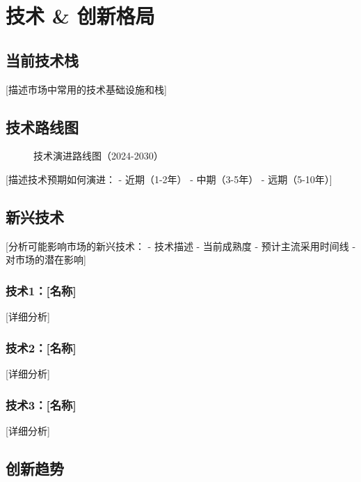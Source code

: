 \documentclass[11pt,letterpaper]{report}
\begin{document}
{\chapter{技术 \& 创新格局}

\section{当前技术栈}

[描述市场中常用的技术基础设施和栈]

\section{技术路线图}


\begin{figure}[htbp]
\centering
\caption{技术演进路线图（2024-2030）}
\label{fig:tech_roadmap}
\end{figure}

[描述技术预期如何演进：
- 近期（1-2年）
- 中期（3-5年）
- 远期（5-10年）]

\section{新兴技术}

[分析可能影响市场的新兴技术：
- 技术描述
- 当前成熟度
- 预计主流采用时间线
- 对市场的潜在影响]

\subsection{技术1：[名称]}
[详细分析]

\subsection{技术2：[名称]}
[详细分析]

\subsection{技术3：[名称]}
[详细分析]

\section{创新趋势}

}
\end{document}
